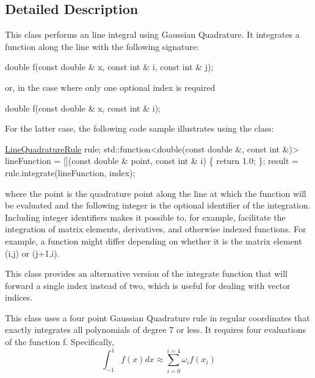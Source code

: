 \subsection{Detailed Description}
This class performs an line integral using Gaussian Quadrature. It integrates a function along the line with the following signature\+: 
\begin{DoxyCode}
\textcolor{keywordtype}{double} f(\textcolor{keyword}{const} \textcolor{keywordtype}{double} & x, \textcolor{keyword}{const} \textcolor{keywordtype}{int} & i, \textcolor{keyword}{const} \textcolor{keywordtype}{int} & j);
\end{DoxyCode}
 or, in the case where only one optional index is required 
\begin{DoxyCode}
\textcolor{keywordtype}{double} f(\textcolor{keyword}{const} \textcolor{keywordtype}{double} & x, \textcolor{keyword}{const} \textcolor{keywordtype}{int} & i);
\end{DoxyCode}
 For the latter case, the following code sample illustrates using the class\+: 
\begin{DoxyCode}
\hyperlink{a00862_ab811321337291e043129e0ec7d90f876}{LineQuadratureRule} rule;
std::function<double(\textcolor{keyword}{const} \textcolor{keywordtype}{double} &,
   \textcolor{keyword}{const} \textcolor{keywordtype}{int} &)> lineFunction = [](\textcolor{keyword}{const} \textcolor{keywordtype}{double} & point,
   \textcolor{keyword}{const} \textcolor{keywordtype}{int} & i) \{
   \textcolor{keywordflow}{return} 1.0;
\};
result = rule.integrate(lineFunction, index);
\end{DoxyCode}
 where the point is the quadrature point along the line at which the function will be evaluated and the following integer is the optional identifier of the integration. Including integer identifiers makes it possible to, for example, facilitate the integration of matrix elements, derivatives, and otherwise indexed functions. For example, a function might differ depending on whether it is the matrix element (i,j) or (j+1,i).

This class provides an alternative version of the integrate function that will forward a single index instead of two, which is useful for dealing with vector indices.

This class uses a four point Gaussian Quadrature rule in regular coordinates that exactly integrates all polynomials of degree 7 or less. It requires four evaluations of the function f. Specifically, \[ \int_{-1}^{1} f(x) dx \approx \sum_{i=0}^{i=4} \omega_{i}f(x_{i}) \]


